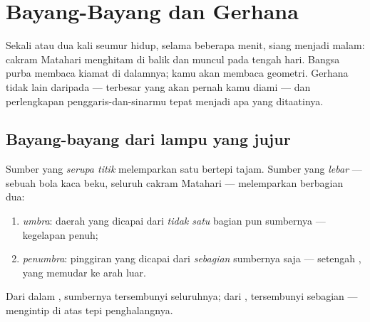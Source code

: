\chapter{Bayang-Bayang dan Gerhana}\label{ch:g7:shadows-eclipses}

Sekali atau dua kali seumur hidup, selama beberapa menit, siang
menjadi malam: cakram Matahari menghitam di balik  dan 
muncul pada tengah hari. Bangsa purba membaca kiamat di dalamnya; kamu
akan membaca geometri. Gerhana tidak lain daripada  ---
 terbesar yang akan pernah kamu diami --- dan perlengkapan
penggaris-dan-sinarmu tepat menjadi apa yang ditaatinya.

\section{Bayang-bayang dari lampu yang jujur}

\begin{proposition}\label{prop:g7:shadows-eclipses:umbra}
Sumber yang \emph{serupa titik} melemparkan satu 
bertepi tajam. Sumber yang \emph{lebar} --- sebuah bola kaca beku,
seluruh cakram Matahari --- melemparkan  berbagian dua:
\begin{enumerate}
  \item \emph{umbra}: daerah yang dicapai  dari
        \emph{tidak satu} bagian pun sumbernya --- kegelapan penuh;
  \item \emph{penumbra}: pinggiran yang dicapai
         dari \emph{sebagian} sumbernya saja --- setengah
        , yang memudar ke arah luar.
\end{enumerate}
Dari dalam , sumbernya tersembunyi seluruhnya; dari
, tersembunyi sebagian --- mengintip di atas tepi
penghalangnya.
\end{proposition}

